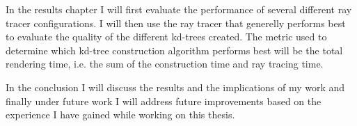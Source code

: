 
In the results chapter I will first evaluate the performance of several
different ray tracer configurations. I will then use the ray tracer that
generelly performs best to evaluate the quality of the different kd-trees
created. The metric used to determine which kd-tree construction algorithm
performs best will be the total rendering time, i.e. the sum of the construction
time and ray tracing time.


In the conclusion I will discuss the results and the implications of my work and
finally under future work I will address future improvements based on the
experience I have gained while working on this thesis.

